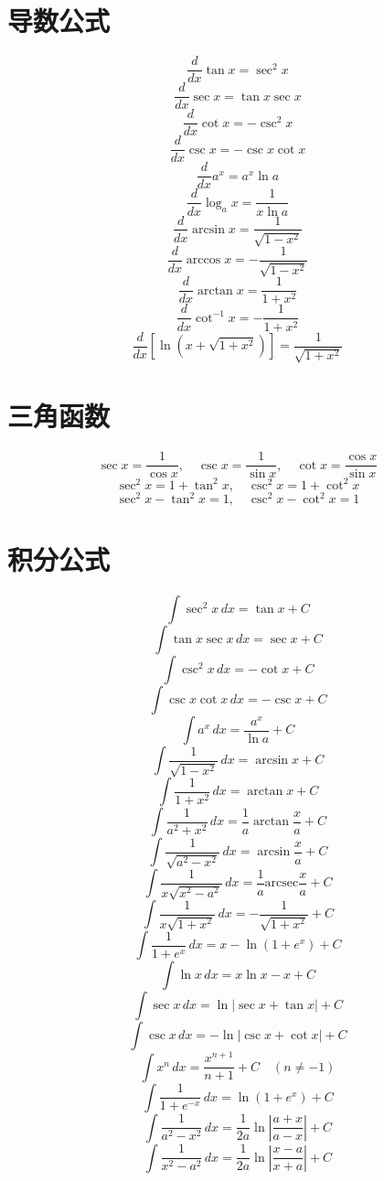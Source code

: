 \documentclass[10pt]{article}
\begin{document}
\begin{multicols*}{3}
\raggedcolumns

\section*{导数公式}
\vspace{-8pt}

\[\frac{d}{dx}\tan x = \sec^2 x\]
\[\frac{d}{dx}\sec x = \tan x \sec x\]
\[\frac{d}{dx}\cot x = -\csc^2 x\]
\[\frac{d}{dx}\csc x = -\csc x \cot x\]
\[\frac{d}{dx}a^x = a^x \ln a\]
\[\frac{d}{dx}\log_a x = \frac{1}{x \ln a}\]
\[\frac{d}{dx}\arcsin x = \frac{1}{\sqrt{1 - x^2}}\]
\[\frac{d}{dx}\arccos x = -\frac{1}{\sqrt{1 - x^2}}\]
\[\frac{d}{dx}\arctan x = \frac{1}{1 + x^2}\]
\[\frac{d}{dx}\cot^{-1} x = -\frac{1}{1 + x^2}\]
\[\frac{d}{dx}[\ln(x + \sqrt{1 + x^2})] = \frac{1}{\sqrt{1 + x^2}}\]

\section*{三角函数}
\vspace{-8pt}

\[\sec x = \frac{1}{\cos x}, \quad \csc x = \frac{1}{\sin x}, \quad \cot x = \frac{\cos x}{\sin x}\]
\[\sec^2 x = 1 + \tan^2 x, \quad \csc^2 x = 1 + \cot^2 x\]
\[\sec^2 x - \tan^2 x = 1, \quad \csc^2 x - \cot^2 x = 1\]

\columnbreak  %

\section*{积分公式}
\vspace{-8pt}

\[\int \sec^2 x \, dx = \tan x + C\]
\[\int \tan x \sec x \, dx = \sec x + C\]
\[\int \csc^2 x \, dx = -\cot x + C\]
\[\int \csc x \cot x \, dx = -\csc x + C\]
\[\int a^x \, dx = \frac{a^x}{\ln a} + C\]
\[\int \frac{1}{\sqrt{1 - x^2}} \, dx = \arcsin x + C\]
\[\int \frac{1}{1 + x^2} \, dx = \arctan x + C\]
\[\int \frac{1}{a^2 + x^2} \, dx = \frac{1}{a} \arctan \frac{x}{a} + C\]
\[\int \frac{1}{\sqrt{a^2 - x^2}} \, dx = \arcsin \frac{x}{a} + C\]
\[\int \frac{1}{x \sqrt{x^2 - a^2}} \, dx = \frac{1}{a} \text{arcsec} \frac{x}{a} + C\]
\[\int \frac{1}{x \sqrt{1 + x^2}} \, dx = -\frac{1}{\sqrt{1 + x^2}} + C\]
\[\int \frac{1}{1 + e^x} \, dx = x - \ln(1 + e^x) + C\]
\[\int \ln x \, dx = x \ln x - x + C\]
\[\int \sec x \, dx = \ln|\sec x + \tan x| + C\]
\[\int \csc x \, dx = -\ln|\csc x + \cot x| + C\]
\[\int x^n \, dx = \frac{x^{n+1}}{n+1} + C \quad (n \neq -1)\]
\[\int \frac{1}{1 + e^{-x}} \, dx = \ln(1 + e^x) + C\]
\[\int \frac{1}{a^2 - x^2} \, dx = \frac{1}{2a} \ln\left|\frac{a + x}{a - x}\right| + C\]
\[\int \frac{1}{x^2 - a^2} \, dx = \frac{1}{2a} \ln\left|\frac{x - a}{x + a}\right| + C\]


\end{multicols*}
\end{document}
